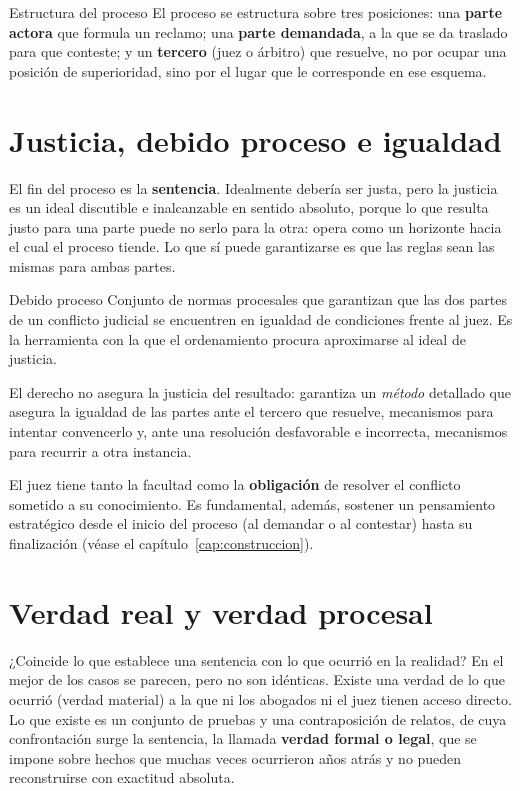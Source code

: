 \documentclass[12pt,oneside]{book}
\begin{document}
\begin{definicion}{Estructura del proceso}
El proceso se estructura sobre tres posiciones: una \textbf{parte actora} que formula un reclamo; una \textbf{parte demandada}, a la que se da traslado para que conteste; y un \textbf{tercero} (juez o árbitro) que resuelve, no por ocupar una posición de superioridad, sino por el lugar que le corresponde en ese esquema.
\end{definicion}

\section{Justicia, debido proceso e igualdad}

El fin del proceso es la \textbf{sentencia}. Idealmente debería ser justa, pero la justicia es un ideal discutible e inalcanzable en sentido absoluto, porque lo que resulta justo para una parte puede no serlo para la otra: opera como un horizonte hacia el cual el proceso tiende. Lo que sí puede garantizarse es que las reglas sean las mismas para ambas partes.

\begin{definicion}{Debido proceso}
Conjunto de normas procesales que garantizan que las dos partes de un conflicto judicial se encuentren en igualdad de condiciones frente al juez. Es la herramienta con la que el ordenamiento procura aproximarse al ideal de justicia.
\end{definicion}

\begin{importante}
El derecho no asegura la justicia del resultado: garantiza un \emph{método} detallado que asegura la igualdad de las partes ante el tercero que resuelve, mecanismos para intentar convencerlo y, ante una resolución desfavorable e incorrecta, mecanismos para recurrir a otra instancia.
\end{importante}

El juez tiene tanto la facultad como la \textbf{obligación} de resolver el conflicto sometido a su conocimiento. Es fundamental, además, sostener un pensamiento estratégico desde el inicio del proceso (al demandar o al contestar) hasta su finalización (véase el capítulo~\ref{cap:construccion}).

\section{Verdad real y verdad procesal}

¿Coincide lo que establece una sentencia con lo que ocurrió en la realidad? En el mejor de los casos se parecen, pero no son idénticas. Existe una verdad de lo que ocurrió (verdad material) a la que ni los abogados ni el juez tienen acceso directo. Lo que existe es un conjunto de pruebas y una contraposición de relatos, de cuya confrontación surge la sentencia, la llamada \textbf{verdad formal o legal}, que se impone sobre hechos que muchas veces ocurrieron años atrás y no pueden reconstruirse con exactitud absoluta.
\end{document}
